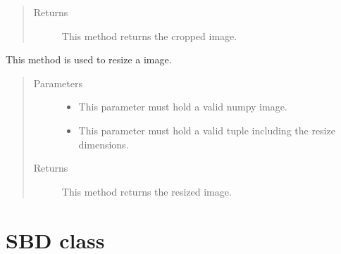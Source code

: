 \documentclass[letterpaper,10pt,english,openany,oneside]{sphinxmanual}
\begin{document}
\begin{fulllineitems}
\begin{fulllineitems}
\begin{quote}
\begin{description}
\begin{itemize}
\end{itemize}

\item[{Returns}] \leavevmode
This method returns the cropped image.

\end{description}\end{quote}

\end{fulllineitems}


\begin{fulllineitems}
\label{\detokenize{PreProcessing:sbd.PreProcessing.PreProcessing.resize}}
This method is used to resize a image.
\begin{quote}\begin{description}
\item[{Parameters}] \leavevmode\begin{itemize}
\item {} 
 \textendash{} This parameter must hold a valid numpy image.

\item {} 
 \textendash{} This parameter must hold a valid tuple including the resize dimensions.

\end{itemize}

\item[{Returns}] \leavevmode
This method returns the resized image.

\end{description}\end{quote}

\end{fulllineitems}


\end{fulllineitems}



\section{SBD class}
\label{\detokenize{SBD:sbd-class}}\label{\detokenize{SBD::doc}}
\end{document}
